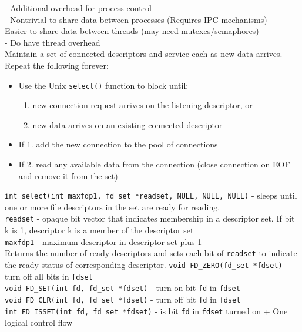 \documentclass[number]{notes}
\begin{document}
\begin{landscape}
\begin{multicols}{3}
- Additional overhead for process control\\
- Nontrivial to share data between processes (Requires IPC mechanisms)
+ Easier to share data between threads (may need mutexes/semaphores)\\
- Do have thread overhead\\
Maintain a set of connected descriptors and service each as new data arrives. Repeat the following forever:
\begin{itemize}[nolistsep]
    \item Use the Unix \texttt{select()} function to block until:
    \begin{enumerate}[nolistsep]
        \item new connection request arrives on the listening descriptor, or
        \item new data arrives on an existing connected descriptor
    \end{enumerate}
    \item If 1. add the new connection to the pool of connections
    \item If 2. read any available data from the connection (close connection on EOF and remove it from the set)
\end{itemize}
\texttt{int select(int maxfdp1, fd\_set *readset, NULL, NULL, NULL)} - sleeps until one or more file descriptors in the set are ready for reading.\\
\texttt{readset} - opaque bit vector that indicates membership in a descriptor set. If bit k is 1, descriptor k is a member of the descriptor set\\
\texttt{maxfdp1} - maximum descriptor in descriptor set plus 1\\
Returns the number of ready descriptors and sets each bit of \texttt{readset} to indicate the ready status of corresponding descriptor.
\texttt{void FD\_ZERO(fd\_set *fdset)} - turn off all bits in \texttt{fdset}\\
\texttt{void FD\_SET(int fd, fd\_set *fdset)} - turn on bit \texttt{fd} in \texttt{fdset}\\
\texttt{void FD\_CLR(int fd, fd\_set *fdset)} - turn off bit \texttt{fd} in \texttt{fdset}\\
\texttt{int FD\_ISSET(int fd, fd\_set *fdset)} - is bit \texttt{fd} in \texttt{fdset} turned on
+ One logical control flow\\

\end{multicols}
\end{landscape}
\end{document}
